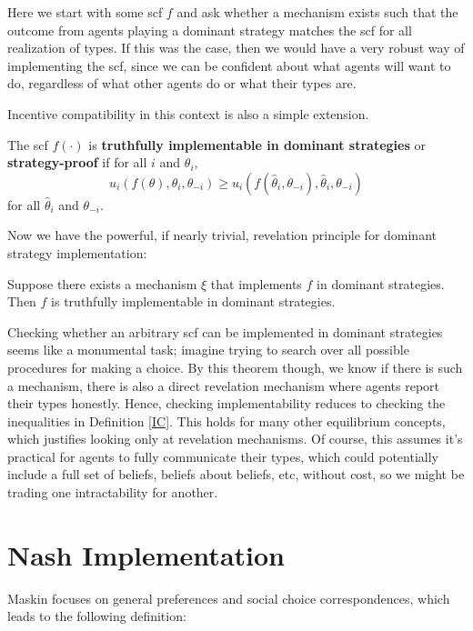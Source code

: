 \documentclass[10pt]{article}
\begin{document}
\begin{spacing}{1.0}
Here we start with some scf $f$ and ask whether a mechanism exists such
that the outcome from agents playing a dominant strategy matches the scf
for all realization of types. If this was the case, then we would have a
very robust way of implementing the scf, since we can be confident about
what agents will want to do, regardless of what other agents do or what their types are.

\hspace{1em}
Incentive compatibility in this context is also a simple
extension.
\begin{definition}\label{IC}
  The scf $f(\cdot)$ is \textbf{truthfully implementable in dominant
  strategies} or \textbf{strategy-proof} if for all $i$ and $\theta_i$, \[u_i(f(\theta),\theta_i, \theta_{-i})
  \geq u_i(f(\hat{\theta}_i, \theta_{-i}),
  \hat{\theta}_i, \theta_{-i})\] for all $\hat{\theta}_i$
  and $\theta_{-i}$.
\end{definition}

Now we have the powerful, if nearly trivial,
revelation principle for dominant strategy implementation:
\begin{theorem}
  Suppose there exists a mechanism $\xi$ that implements
  $f$ in dominant strategies. Then $f$ is truthfully
  implementable in dominant strategies.
\end{theorem}

Checking whether an arbitrary scf can be implemented in dominant strategies
seems like a monumental task; imagine trying to search over all possible
procedures for making a choice. By this theorem though, we know if there is
such a mechanism, there is also a direct revelation mechanism where
agents report their types honestly. Hence, checking implementability
reduces to checking the inequalities in Definition \ref{IC}. This
holds for many other equilibrium concepts, which justifies looking only at
revelation mechanisms. Of course, this assumes it's practical for agents to
fully communicate their types, which could potentially include a full set
of beliefs, beliefs about beliefs, etc, without cost, so we might be
trading one intractability for another.

\section{Nash Implementation}
\label{sec:nash-implementation}

Maskin focuses on general preferences and social choice correspondences,
which leads to the following definition:


\end{spacing}
\end{document}
